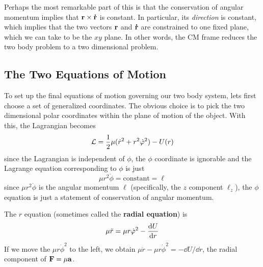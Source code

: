 Perhaps the most remarkable part of this is that the conservation of angular momentum implies that $\mathbf{r} \times \mathbf{\dot r}$ is constant. In particular, its \textit{direction} is constant, which implies that the two vectors $\mathbf{r}$ and $\mathbf{\dot r}$ are constrained to one fixed plane, which we can take to be the $xy$ plane. In other words, the CM frame reduces the two body problem to a two dimensional problem. 
\subsection*{The Two Equations of Motion}
To set up the final equations of motion governing our two body system, lets first choose a set of generalized coordinates. The obvious choice is to pick the two dimensional polar coordinates within the plane of motion of the object. With this, the Lagrangian becomes
\[ \mathcal{L} = \frac{1}{2}\mu(\dot r^2 + r^2\dot{\varphi}^2) - U(r)\]
since the Lagrangian is independent of $\phi$, the $\phi$ coordinate is ignorable and the Lagrange equation corresponding to $\phi$ is just
\[ \mu r^2\dot\phi = \text{constant} = \ell \]
since $\mu r^2 \dot\phi$ is the angular momentum $\ell$ (specifically, the $z$ component $\ell_z$), the $\phi$ equation is just a statement of conservation of angular momentum.

The $r$ equation (sometimes called the \textbf{radial equation}) is
\[ \mu \ddot r = \mu r\dot{\varphi}^2 -\dv{U}{r} \]
If we move the $\mu r\dot\phi^2$ to the left, we obtain $\mu \ddot r - \mu r\dot\phi^2 = -\dd U/\dd r$, the radial component of $\mathbf{F} = \mu \mathbf{a}$. 
